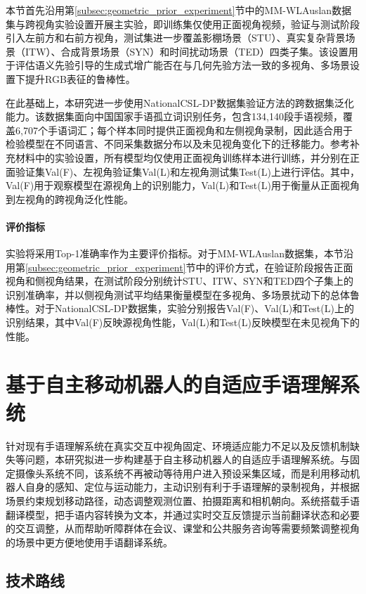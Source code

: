 本节首先沿用第\ref{subsec:geometric_prior_experiment}节中的MM-WLAuslan\citep{shen2024mm}数据集与跨视角实验设置开展主实验，即训练集仅使用正面视角视频，验证与测试阶段引入左前方和右前方视角，测试集进一步覆盖影棚场景（STU）、真实复杂背景场景（ITW）、合成背景场景（SYN）和时间扰动场景（TED）四类子集。该设置用于评估语义先验引导的生成式增广能否在与几何先验方法一致的多视角、多场景设置下提升RGB表征的鲁棒性。

在此基础上，本研究进一步使用NationalCSL-DP\citep{jin2025nationalcsl}数据集验证方法的跨数据集泛化能力。该数据集面向中国国家手语孤立词识别任务，包含134,140段手语视频，覆盖6,707个手语词汇；每个样本同时提供正面视角和左侧视角录制，因此适合用于检验模型在不同语言、不同采集数据分布以及未见视角变化下的迁移能力。参考补充材料中的实验设置，所有模型均仅使用正面视角训练样本进行训练，并分别在正面验证集Val(F)、左视角验证集Val(L)和左视角测试集Test(L)上进行评估。其中，Val(F)用于观察模型在源视角上的识别能力，Val(L)和Test(L)用于衡量从正面视角到左视角的跨视角泛化性能。

\paragraph{评价指标}

实验将采用Top-1准确率作为主要评价指标。对于MM-WLAuslan数据集，本节沿用第\ref{subsec:geometric_prior_experiment}节中的评价方式，在验证阶段报告正面视角和侧视角结果，在测试阶段分别统计STU、ITW、SYN和TED四个子集上的识别准确率，并以侧视角测试平均结果衡量模型在多视角、多场景扰动下的总体鲁棒性。对于NationalCSL-DP数据集，实验分别报告Val(F)、Val(L)和Test(L)上的识别结果，其中Val(F)反映源视角性能，Val(L)和Test(L)反映模型在未见视角下的性能。

\section{基于自主移动机器人的自适应手语理解系统}

针对现有手语理解系统在真实交互中视角固定、环境适应能力不足以及反馈机制缺失等问题，本研究拟进一步构建基于自主移动机器人的自适应手语理解系统。与固定摄像头系统不同，该系统不再被动等待用户进入预设采集区域，而是利用移动机器人自身的感知、定位与运动能力，主动识别有利于手语理解的录制视角，并根据场景约束规划移动路径，动态调整观测位置、拍摄距离和相机朝向。系统搭载手语翻译模型，把手语内容转换为文本，并通过实时交互反馈提示当前翻译状态和必要的交互调整，从而帮助听障群体在会议、课堂和公共服务咨询等需要频繁调整视角的场景中更方便地使用手语翻译系统。

\subsection{技术路线}

